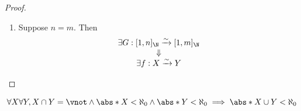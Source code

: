 \begin{proof}
\begin{itemize}
\begin{enumerate}[label=\textbf{(\Alph*)}]
\[\begin{array}{c}
                      \exists f: X \twoheadrightarrow Y
                    \end{array}
                  \]
            \item Suppose $n = m$. Then
                  \[
                    \begin{array}{c}
                      \exists G: [1, n]_{\N} \xrightarrow{\sim} [1, m]_{\N} \\
                      \Downarrow                                            \\
                      \exists f: X \xrightarrow{\sim} Y
                    \end{array}
                  \]
          \end{enumerate}
  \end{itemize}
\end{proof}

\begin{lemma} \label{an1:lem:union-of-two-disjoint-finite-sets-is-finite}
  \[
    \forall X \forall Y, X \cap Y = \vnot \land \abs*{X} < \aleph_{0} \land \abs*{Y} < \aleph_{0}
    \implies \abs*{X \cup Y} < \aleph_{0}
  \]
\end{lemma}

